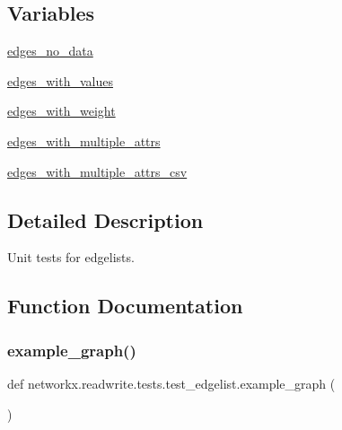 \subsection*{Variables}
\begin{DoxyCompactItemize}
\item 
\hyperlink{namespacenetworkx_1_1readwrite_1_1tests_1_1test__edgelist_ae19cab67c650686cec7e5fc9bb9bffec}{edges\+\_\+no\+\_\+data}
\item 
\hyperlink{namespacenetworkx_1_1readwrite_1_1tests_1_1test__edgelist_ade215113a1b368de4afb0c3994b48b56}{edges\+\_\+with\+\_\+values}
\item 
\hyperlink{namespacenetworkx_1_1readwrite_1_1tests_1_1test__edgelist_af744dafc9bb11ed819b737a389c19dd9}{edges\+\_\+with\+\_\+weight}
\item 
\hyperlink{namespacenetworkx_1_1readwrite_1_1tests_1_1test__edgelist_aaba6d6636e0ef79ec02ac5d85765216d}{edges\+\_\+with\+\_\+multiple\+\_\+attrs}
\item 
\hyperlink{namespacenetworkx_1_1readwrite_1_1tests_1_1test__edgelist_a8e0c220ec02ebb31173bc4387838f07f}{edges\+\_\+with\+\_\+multiple\+\_\+attrs\+\_\+csv}
\end{DoxyCompactItemize}


\subsection{Detailed Description}
\begin{DoxyVerb}    Unit tests for edgelists.
\end{DoxyVerb}
 

\subsection{Function Documentation}
\mbox{\label{namespacenetworkx_1_1readwrite_1_1tests_1_1test__edgelist_ac79f13c939b3b5a7fff3732364cdff29}} 
\subsubsection{\texorpdfstring{example\+\_\+graph()}{example\_graph()}}
{\footnotesize\ttfamily def networkx.\+readwrite.\+tests.\+test\+\_\+edgelist.\+example\+\_\+graph (\begin{DoxyParamCaption}{ }\end{DoxyParamCaption})}

